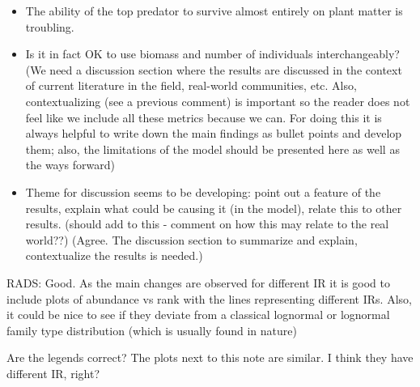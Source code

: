 \begin{itemize}
\begin{itemize}
	\item The ability of the top predator to survive almost entirely on plant matter is troubling.
	
	\item Is it in fact OK to use biomass and number of individuals interchangeably? 	(We need a discussion section where the results are discussed in the context of current literature in the field, real-world communities, etc. Also, contextualizing (see a previous comment) is important so the reader does not feel like we include all these metrics because we can. For doing this it is always helpful to write down the main findings as bullet points and develop them; also, the limitations of the model should be presented here as well as the ways forward)
	
	\item Theme for discussion seems to be developing: point out a feature of the results, explain what could be causing it (in the model), relate this to other results. (should add to this - comment on how this may relate to the real world??) (Agree. The discussion section to summarize and explain, contextualize the results is needed.)
\end{itemize}

RADS: Good. As the main changes are observed for different IR it is good to include plots of abundance vs rank with the lines representing different IRs. Also, it could be nice to see if they deviate from a classical lognormal or lognormal family type distribution (which is usually found in nature)

Are the legends correct? The plots next to this note are similar. I think they have different IR, right?

\end{itemize}
